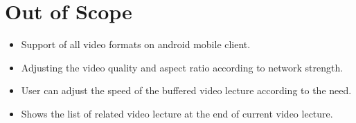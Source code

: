 \section{Out of Scope}
\begin{itemize}
\item Support of all video formats on android mobile client.
\item Adjusting the video quality and aspect ratio according to network strength.
\item User can adjust the speed of the buffered video lecture according to the need.
\item Shows the list of related video lecture at the end of current video lecture.
\end{itemize}
